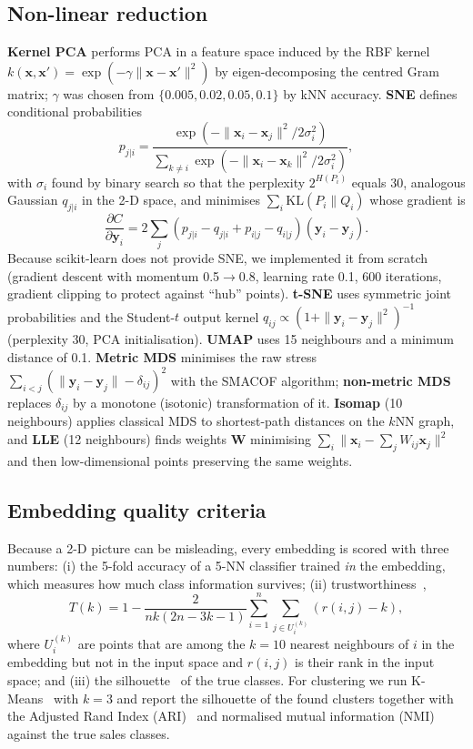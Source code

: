 \subsection{Non-linear reduction}
\textbf{Kernel PCA} performs PCA in a feature space induced by the RBF kernel $k(\mathbf{x},\mathbf{x}')=\exp(-\gamma\|\mathbf{x}-\mathbf{x}'\|^2)$ by eigen-decomposing the centred Gram matrix; $\gamma$ was chosen from $\{0.005,0.02,0.05,0.1\}$ by kNN accuracy. \textbf{SNE} defines conditional probabilities
\begin{equation}
p_{j|i}=\frac{\exp(-\|\mathbf{x}_i-\mathbf{x}_j\|^2/2\sigma_i^2)}{\sum_{k\neq i}\exp(-\|\mathbf{x}_i-\mathbf{x}_k\|^2/2\sigma_i^2)},
\end{equation}
with $\sigma_i$ found by binary search so that the perplexity $2^{H(P_i)}$ equals 30, analogous Gaussian $q_{j|i}$ in the 2-D space, and minimises $\sum_i \mathrm{KL}(P_i\|Q_i)$ whose gradient is
\begin{equation}
\frac{\partial C}{\partial\mathbf{y}_i}=2\sum_j\left(p_{j|i}-q_{j|i}+p_{i|j}-q_{i|j}\right)(\mathbf{y}_i-\mathbf{y}_j).
\end{equation}
Because scikit-learn does not provide SNE, we implemented it from scratch (gradient descent with momentum 0.5$\to$0.8, learning rate 0.1, 600 iterations, gradient clipping to protect against ``hub'' points). \textbf{t-SNE} uses symmetric joint probabilities and the Student-$t$ output kernel $q_{ij}\propto(1+\|\mathbf{y}_i-\mathbf{y}_j\|^2)^{-1}$ (perplexity 30, PCA initialisation). \textbf{UMAP} uses 15 neighbours and a minimum distance of 0.1. \textbf{Metric MDS} minimises the raw stress $\sum_{i<j}(\|\mathbf{y}_i-\mathbf{y}_j\|-\delta_{ij})^2$ with the SMACOF algorithm; \textbf{non-metric MDS} replaces $\delta_{ij}$ by a monotone (isotonic) transformation of it. \textbf{Isomap} (10 neighbours) applies classical MDS to shortest-path distances on the $k$NN graph, and \textbf{LLE} (12 neighbours) finds weights $\mathbf{W}$ minimising $\sum_i\|\mathbf{x}_i-\sum_j W_{ij}\mathbf{x}_j\|^2$ and then low-dimensional points preserving the same weights.

\subsection{Embedding quality criteria}
Because a 2-D picture can be misleading, every embedding is scored with three numbers: (i) the 5-fold accuracy of a 5-NN classifier trained \emph{in} the embedding, which measures how much class information survives; (ii) trustworthiness~\cite{venna2006},
\begin{equation}
T(k)=1-\frac{2}{nk(2n-3k-1)}\sum_{i=1}^{n}\sum_{j\in U_i^{(k)}}\left(r(i,j)-k\right),
\end{equation}
where $U_i^{(k)}$ are points that are among the $k=10$ nearest neighbours of $i$ in the embedding but not in the input space and $r(i,j)$ is their rank in the input space; and (iii) the silhouette~\cite{rousseeuw1987} of the true classes. For clustering we run K-Means~\cite{lloyd1982} with $k=3$ and report the silhouette of the found clusters together with the Adjusted Rand Index (ARI)~\cite{hubert1985} and normalised mutual information (NMI) against the true sales classes.

